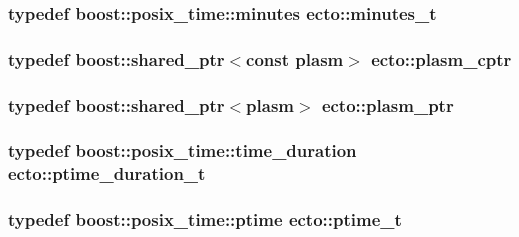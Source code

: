 \hypertarget{namespaceecto_ad57e5ebf1455dd895ce11804e47669e5}{
\subsubsection[{minutes\-\_\-t}]{\setlength{\rightskip}{0pt plus 5cm}typedef boost\-::posix\-\_\-time\-::minutes {\bf ecto\-::minutes\-\_\-t}}}\label{namespaceecto_ad57e5ebf1455dd895ce11804e47669e5}
\hypertarget{namespaceecto_a5a9973f00c94e30353acb27c3d2fa836}{
\subsubsection[{plasm\-\_\-cptr}]{\setlength{\rightskip}{0pt plus 5cm}typedef boost\-::shared\-\_\-ptr$<$const {\bf plasm}$>$ {\bf ecto\-::plasm\-\_\-cptr}}}\label{namespaceecto_a5a9973f00c94e30353acb27c3d2fa836}
\hypertarget{namespaceecto_a6b83be6cd685db71f03b14871653475f}{
\subsubsection[{plasm\-\_\-ptr}]{\setlength{\rightskip}{0pt plus 5cm}typedef boost\-::shared\-\_\-ptr$<${\bf plasm}$>$ {\bf ecto\-::plasm\-\_\-ptr}}}\label{namespaceecto_a6b83be6cd685db71f03b14871653475f}
\hypertarget{namespaceecto_a0952d5ebd059cbd79b978ecab9ec781c}{
\subsubsection[{ptime\-\_\-duration\-\_\-t}]{\setlength{\rightskip}{0pt plus 5cm}typedef boost\-::posix\-\_\-time\-::time\-\_\-duration {\bf ecto\-::ptime\-\_\-duration\-\_\-t}}}\label{namespaceecto_a0952d5ebd059cbd79b978ecab9ec781c}
\hypertarget{namespaceecto_a5bbe8fb0da047cb18d92eb9dfb469652}{
\subsubsection[{ptime\-\_\-t}]{\setlength{\rightskip}{0pt plus 5cm}typedef boost\-::posix\-\_\-time\-::ptime {\bf ecto\-::ptime\-\_\-t}}}\label{namespaceecto_a5bbe8fb0da047cb18d92eb9dfb469652}
